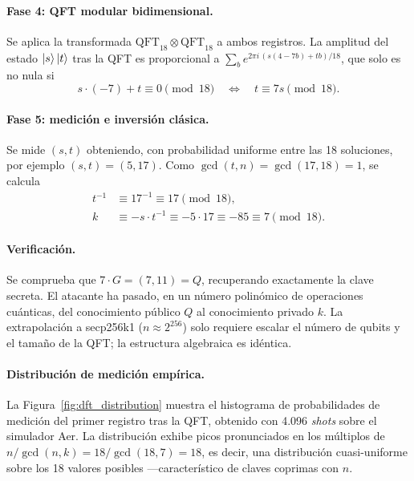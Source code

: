 \paragraph{Fase 4: QFT modular bidimensional.} Se aplica la transformada $\text{QFT}_{18} \otimes \text{QFT}_{18}$ a ambos registros. La amplitud del estado $\ket{s}\ket{t}$ tras la QFT es proporcional a $\sum_b e^{2\pi i \, (s(4-7b) + tb)/18}$, que solo es no nula si
\begin{equation}
  s \cdot (-7) + t \equiv 0 \pmod{18} \quad\Longleftrightarrow\quad t \equiv 7s \pmod{18}.
\end{equation}

\paragraph{Fase 5: medición e inversión clásica.} Se mide $(s, t)$ obteniendo, con probabilidad uniforme entre las 18 soluciones, por ejemplo $(s, t) = (5, 17)$. Como $\gcd(t, n) = \gcd(17, 18) = 1$, se calcula
\begin{align}
  t^{-1} &\equiv 17^{-1} \equiv 17 \pmod{18},\\
  k &\equiv -s \cdot t^{-1} \equiv -5 \cdot 17 \equiv -85 \equiv \boxed{7} \pmod{18}.
\end{align}

\paragraph{Verificación.} Se comprueba que $7 \cdot G = (7, 11) = Q$, recuperando exactamente la clave secreta. El atacante ha pasado, en un número polinómico de operaciones cuánticas, del conocimiento público $Q$ al conocimiento privado $k$. La extrapolación a secp256k1 ($n \approx 2^{256}$) solo requiere escalar el número de qubits y el tamaño de la QFT; la estructura algebraica es idéntica.

\paragraph{Distribución de medición empírica.} La Figura~\ref{fig:dft_distribution} muestra el histograma de probabilidades de medición del primer registro tras la QFT, obtenido con 4.096 \emph{shots} sobre el simulador Aer. La distribución exhibe picos pronunciados en los múltiplos de $n / \gcd(n, k) = 18 / \gcd(18, 7) = 18$, es decir, una distribución cuasi-uniforme sobre los 18 valores posibles ---característico de claves coprimas con $n$.

